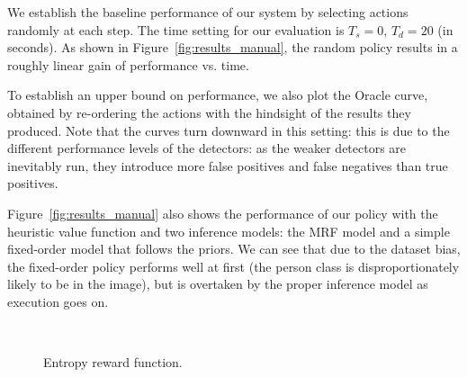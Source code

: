 We establish the baseline performance of our system by selecting actions randomly at each step.
The time setting for our evaluation is $T_s=0$, $T_d=20$ (in seconds).
As shown in Figure~\ref{fig:results_manual}, the random policy results in a roughly linear gain of performance vs. time.

To establish an upper bound on performance, we also plot the Oracle curve, obtained by re-ordering the actions with the hindsight of the results they produced.
Note that the curves turn downward in this setting: this is due to the different performance levels of the detectors: as the weaker detectors are inevitably run, they introduce more false positives and false negatives than true positives.

Figure~\ref{fig:results_manual} also shows the performance of our policy with the heuristic value function and two inference models: the MRF model and a simple fixed-order model that follows the priors.
We can see that due to the dataset bias, the fixed-order policy performs well at first (the person class is disproportionately likely to be in the image), but is overtaken by the proper inference model as execution goes on.

\begin{figure}[h!]
\centering
{} \\
  \caption{Entropy reward function.}
  \label{fig:results_entropy}
\end{figure}

